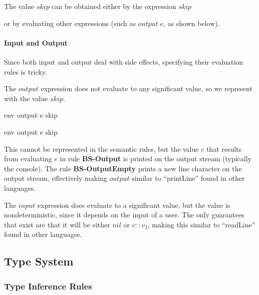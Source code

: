 \documentclass{article}
\begin{document}
The value $skip$ can be obtained either by the expression $skip$

	
or by evaluating other expressions (such as $output \; e$, as shown below).

\paragraph{Input and Output}
Since both input and output deal with side effects, specifying their evaluation rules is tricky.

The $output$ expression does not evaluate to any significant value, so we represent with the value $skip$.

	{\mbox{env} \vdash output \; e \Downarrow skip}
	
	{\mbox{env} \vdash output \; e \Downarrow skip}

This cannot be represented in the semantic rules, but the value $c$ that results from evaluating $e$ in rule \textbf{BS-Output} is printed on the output stream (typically the console).
The rule \textbf{BS-OutputEmpty} prints a new line character on the output stream, effectively making $output$ similar to "`printLine"' found in other languages.

The $input$ expression does evaluate to a significant value, but the value is nondeterministic, since it depends on the input of a user.
The only guarantees that exist are that it will be either $nil$ or $c :: v_2$, making this similar to "`readLine"' found in other languages.


\subsection{Type System}\label{Type System}
	
\subsubsection{Type Inference Rules}

	
	
\end{document}
